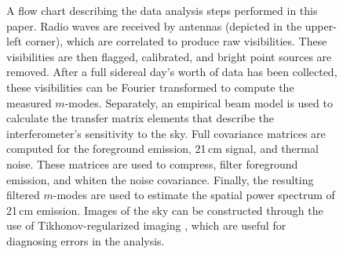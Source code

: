\documentclass[twocolumn]{aastex62}
\begin{document}
\begin{figure}
    \caption{
        A flow chart describing the data analysis steps performed in this paper. Radio waves are
        received by antennas (depicted in the upper-left corner), which are correlated to produce
        raw visibilities. These visibilities are then flagged, calibrated, and bright point sources
        are removed. After a full sidereal day's worth of data has been collected, these
        visibilities can be Fourier transformed to compute the measured $m$-modes. Separately, an
        empirical beam model is used to calculate the transfer matrix elements that describe the
        interferometer's sensitivity to the sky. Full covariance matrices are computed for the
        foreground emission, 21\,cm signal, and thermal noise. These matrices are used to compress,
        filter foreground emission, and whiten the noise covariance. Finally, the resulting filtered
        $m$-modes are used to estimate the spatial power spectrum of 21\,cm emission. Images of the
        sky can be constructed through the use of Tikhonov-regularized imaging
        \citep{2018AJ....156...32E}, which are useful for diagnosing errors in the analysis.
    }
    \label{fig:flowchart}
\end{figure}
\end{document}
